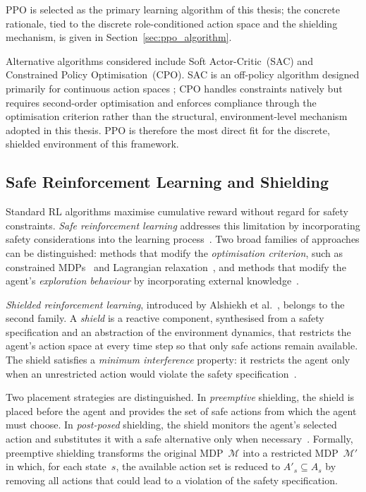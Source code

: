 PPO is selected as the primary learning algorithm of this thesis; the
concrete rationale, tied to the discrete role-conditioned action space
and the shielding mechanism, is given in
Section~\ref{sec:ppo_algorithm}.


Alternative algorithms considered include Soft Actor-Critic~(SAC) and
Constrained Policy Optimisation~(CPO).  SAC is an off-policy algorithm
designed primarily for continuous action
spaces \cite{Haarnoja2018SoftActor};
CPO handles constraints natively but requires second-order optimisation and
enforces compliance through the optimisation criterion rather than the
structural, environment-level mechanism adopted in this thesis.  PPO is
therefore the most direct fit for the discrete, shielded environment of this
framework.

\subsection{Safe Reinforcement Learning and Shielding}
\label{sec:shielding_background}

Standard RL algorithms maximise cumulative reward without regard for safety
constraints.  \emph{Safe reinforcement learning} addresses this limitation by
incorporating safety considerations into the learning
process~\cite{Garcia2015ALearning}.  Two broad families of
approaches can be distinguished: methods that modify the \emph{optimisation
criterion}, such as constrained MDPs~\cite{AltmanCONSTRAINEDPROCESSES} and Lagrangian
relaxation~\cite{Achiam2017ConstrainedOptimization}, and methods that
modify the agent's \emph{exploration behaviour} by incorporating external
knowledge~\cite{Garcia2015ALearning}.

\emph{Shielded reinforcement learning}, introduced by Alshiekh et
al.~\cite{Alshiekh2017SafeShielding}, belongs to the second family.  A \emph{shield} is a
reactive component, synthesised from a safety specification and an abstraction
of the environment dynamics, that restricts the agent's action space at every
time step so that only safe actions remain available.  The shield satisfies a
\emph{minimum interference} property: it restricts the agent only when an
unrestricted action would violate the safety
specification~\cite{Alshiekh2017SafeShielding}.

Two placement strategies are distinguished.  In \emph{preemptive} shielding,
the shield is placed before the agent and provides the set of safe actions from
which the agent must choose.  In \emph{post-posed} shielding, the shield
monitors the agent's selected action and substitutes it with a safe alternative
only when necessary~\cite{Alshiekh2017SafeShielding}.  Formally, preemptive shielding
transforms the original MDP~$\mathcal{M}$ into a restricted
MDP~$\mathcal{M}'$ in which, for each state~$s$, the available action set is
reduced to $A'_s \subseteq A_s$ by removing all actions that could lead to a
violation of the safety specification.

